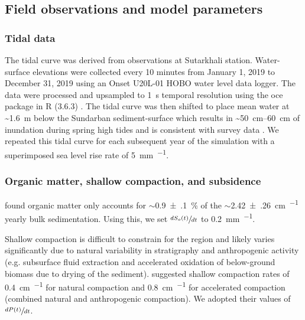 \subsection{Field observations and model parameters}

\bigskip

\subsubsection*{Tidal data}

The tidal curve was derived from observations at Sutarkhali station. Water-surface elevations were collected every 10 minutes from January 1, 2019 to December 31, 2019 using an Onset U20L-01 HOBO water level data logger. The data were processed and upsampled to \SI{1}{\second} temporal resolution using the oce package in R (3.6.3) \citep{kelleyOceAnalysisOceanographic2020}. The tidal curve was then shifted to place mean water at \SI{~1.6}{\meter} below the Sundarban sediment-surface which results in \SIrange{~50}{60}{\centi\meter} of inundation during spring high tides and is consistent with survey data \citep{auerbachFloodRiskNatural2015,haleSeasonalVariabilityForces2019,bomerSurfaceElevationSedimentation2020}. We repeated this tidal curve for each subsequent year of the simulation with a superimposed sea level rise rate of \SI{5}{\milli\meter\per\year}.

\subsubsection*{Organic matter, shallow compaction, and subsidence}

\citet{bomerProcessControlsLive2020} found organic matter only accounts for $\sim$\SI{0.9(1)}{\percent} of the $\sim$\SI{2.42(26)}{\centi\meter\per\year} yearly bulk sedimentation. Using this, we set $\sfrac{dS_o(t)}{dt}$ to \SI{0.2}{\milli\meter\per\year}.

Shallow compaction is difficult to constrain for the region and likely varies significantly due to natural variability in stratigraphy and anthropogenic activity (e.g. subsurface fluid extraction and accelerated oxidation of below-ground biomass due to drying of the sediment). \citet{auerbachFloodRiskNatural2015} suggested shallow compaction rates of \SI{0.4}{\centi\meter\per\year} for natural compaction and \SI{0.8}{\centi\meter\per\year} for accelerated compaction (combined natural and anthropogenic compaction). We adopted their values of $\sfrac{dP(t)}{dt}$.

